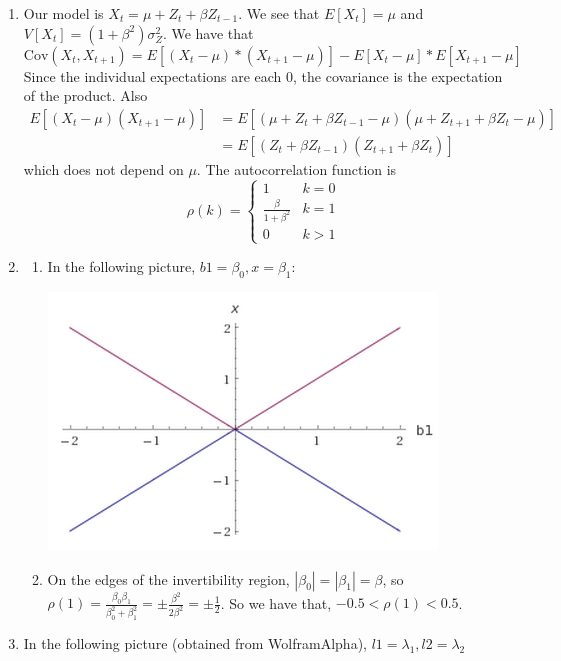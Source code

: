 \documentclass[11pt]{article} %
\newcommand{\tr}{\textrm}
\newcommand{\cov}{\tr{Cov}}
\begin{document}
\begin{enumerate}
\item Our model is $X_t = \mu + Z_t + \beta Z_{t-1}$. We see that $E[X_t] = \mu$ and $V[X_t] = (1 + \beta^2)\sigma_Z^2$. We have that
$$\cov(X_t,X_{t+1}) = E[(X_t-\mu)*(X_{t+1}-\mu)] - E[X_t-\mu]*E[X_{t+1}-\mu]$$
Since the individual expectations are each 0, the covariance is the expectation of the product. Also
\begin{align*}E[(X_t-\mu)(X_{t+1}-\mu)] &= E[(\mu + Z_t + \beta Z_{t-1} - \mu)(\mu + Z_{t+1} + \beta Z_t-\mu)]\\
& = E[(Z_t + \beta Z_{t-1})(Z_{t+1} + \beta Z_t)]\end{align*}
which does not depend on $\mu$. The autocorrelation function is
$$\rho(k)=\begin{cases}
1 &  k = 0 \\
\frac{\beta}{1+\beta^2}    &  k = 1\\
0 &  k > 1
\end{cases}$$

\item
\begin{enumerate}

\item In the following picture, $b1 = \beta_0, x = \beta_1$:

\includegraphics[scale=.6]{plot7.png}

\item On the edges of the invertibility region, $|\beta_0|=|\beta_1|=\beta$, so $\rho(1) = \frac{\beta_0 \beta_1}{\beta_0^2+\beta_1^2} = \pm \frac{\beta^2}{2\beta^2} = \pm \frac{1}{2}$. So we have that, $-0.5<\rho(1)<0.5$.

\end{enumerate}

\item In the following picture (obtained from WolframAlpha), $l1 = \lambda_1, l2 = \lambda_2$


\end{enumerate}
\end{document}
